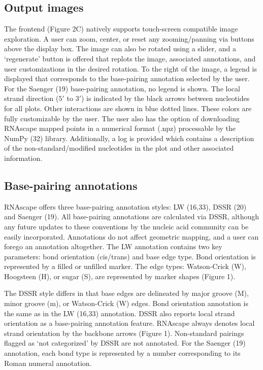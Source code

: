 \subsection{Output images}

The frontend (Figure 2C) natively supports touch-screen compatible image exploration. A user can zoom, center, or reset any zooming/panning via buttons above the display box. The image can also be rotated using a slider, and a ‘regenerate’ button is offered that replots the image, associated annotations, and user customizations in the desired rotation. To the right of the image, a legend is displayed that corresponds to the base-pairing annotation selected by the user. For the Saenger (19) base-pairing annotation, no legend is shown. The local strand direction ($5'$ to $3'$) is indicated by the black arrows between nucleotides for all plots. Other interactions are shown in blue dotted lines. These colors are fully customizable by the user. The user also has the option of downloading RNAscape mapped points in a numerical format (.npz) processable by the NumPy (32) library. Additionally, a log is provided which contains a description of the non-standard/modified nucleotides in the plot and other associated information.

\subsection{Base-pairing annotations}

RNAscape offers three base-pairing annotation styles: LW (16,33), DSSR (20) and Saenger (19). All base-pairing annotations are calculated via DSSR, although any future updates to these conventions by the nucleic acid community can be easily incorporated. Annotations do not affect geometric mapping, and a user can forego an annotation altogether. The LW annotation contains two key parameters: bond orientation (cis/trans) and base edge type. Bond orientation is represented by a filled or unfilled marker. The edge types: Watson-Crick (W), Hoogsteen (H), or sugar (S), are represented by marker shapes (Figure 1).

The DSSR style differs in that base edges are delineated by major groove (M), minor groove (m), or Watson-Crick (W) edges. Bond orientation annotation is the same as in the LW (16,33) annotation. DSSR also reports local strand orientation as a base-pairing annotation feature. RNAscape always denotes local strand orientation by the backbone arrows (Figure 1). Non-standard pairings flagged as ‘not categorized’ by DSSR are not annotated. For the Saenger (19) annotation, each bond type is represented by a number corresponding to its Roman numeral annotation.

